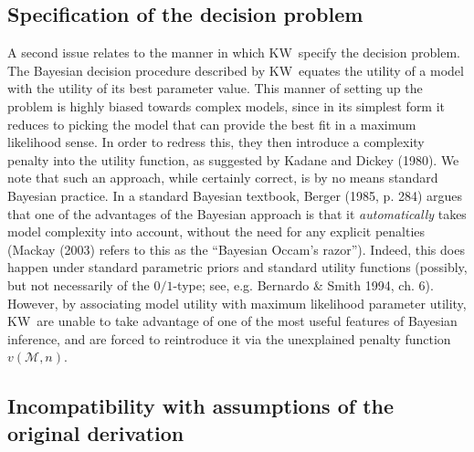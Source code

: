 \documentclass[authoryear]{elsarticle}
\newcommand{\model}{\mathcal{M}}
\newcommand{\kw}{KW}
\begin{document}
\subsection{Specification of the decision problem}

A second issue relates to the manner in which \kw\
specify the decision problem. The Bayesian decision procedure described by
\kw\ equates the utility of a model with the utility of its best parameter
value. This manner of setting up the problem is highly biased
towards complex models, since in its simplest form
it reduces to picking the model that can provide the best fit in a maximum
likelihood sense. In order to redress this, they then introduce a complexity
penalty into the utility function, as suggested by Kadane and Dickey (1980).
We note that such an approach, while certainly correct, is by
no means standard Bayesian practice. In a standard Bayesian textbook,
Berger (1985, p. 284) argues that one of the advantages of the
Bayesian approach is that it {\em automatically\/} takes model
complexity into account, without the need for any explicit penalties
(Mackay (2003) refers to this as the ``Bayesian Occam's razor'').
Indeed, this does happen under standard parametric priors and standard
utility functions (possibly, but not necessarily of the $0/1$-type;
see, e.g. Bernardo \& Smith 1994, ch. 6). However, by associating model
utility with maximum likelihood parameter utility, \kw\
are unable to take advantage of one of the most useful features of
Bayesian inference, and are forced to reintroduce it via the
unexplained penalty function $v(\model,n)$.




\subsection{Incompatibility with assumptions of the original derivation}
\label{incompatibility}
\end{document}
